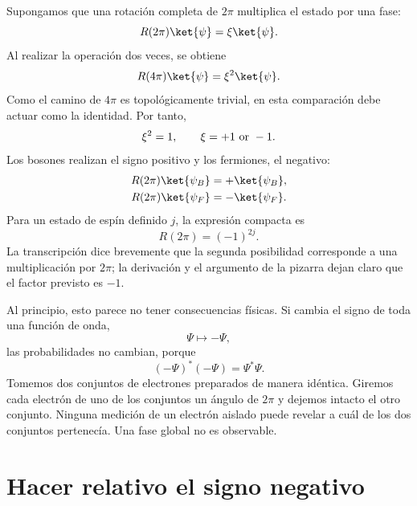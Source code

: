 Supongamos que una rotación completa de \(2\pi\) multiplica el estado por una fase:
\begin{equation}
R(2\pi)\ket{\psi}=\xi\ket{\psi}.
\end{equation}
Al realizar la operación dos veces, se obtiene
\begin{equation}
R(4\pi)\ket{\psi}=\xi^2\ket{\psi}.
\end{equation}
Como el camino de \(4\pi\) es topológicamente trivial, en esta comparación debe actuar como la identidad. Por tanto,
\begin{equation}
\xi^2=1,
\qquad
\xi=+1\ \hbox{or}\ -1.
\end{equation}
Los bosones realizan el signo positivo y los fermiones, el negativo:
\begin{align}
R(2\pi)\ket{\psi_B}&=+\ket{\psi_B},\\
R(2\pi)\ket{\psi_F}&=-\ket{\psi_F}.
\end{align}
Para un estado de espín definido \(j\), la expresión compacta es
\begin{equation}
R(2\pi)=(-1)^{2j}.
\end{equation}
La transcripción dice brevemente que la segunda posibilidad corresponde a una multiplicación por \(2\pi\); la derivación y el argumento de la pizarra dejan claro que el factor previsto es \(-1\).

Al principio, esto parece no tener consecuencias físicas. Si cambia el signo de toda una función de onda,
\begin{equation}
\Psi\longmapsto-\Psi,
\end{equation}
las probabilidades no cambian, porque
\begin{equation}
(-\Psi)^*(-\Psi)=\Psi^*\Psi.
\end{equation}
Tomemos dos conjuntos de electrones preparados de manera idéntica. Giremos cada electrón de uno de los conjuntos un ángulo de \(2\pi\) y dejemos intacto el otro conjunto. Ninguna medición de un electrón aislado puede revelar a cuál de los dos conjuntos pertenecía. Una fase global no es observable.

\section{Hacer relativo el signo negativo}

